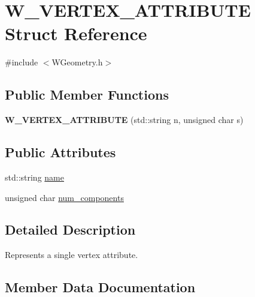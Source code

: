 \hypertarget{struct_w___v_e_r_t_e_x___a_t_t_r_i_b_u_t_e}{}\section{W\+\_\+\+V\+E\+R\+T\+E\+X\+\_\+\+A\+T\+T\+R\+I\+B\+U\+TE Struct Reference}
\label{struct_w___v_e_r_t_e_x___a_t_t_r_i_b_u_t_e}


{\ttfamily \#include $<$W\+Geometry.\+h$>$}

\subsection*{Public Member Functions}
\begin{DoxyCompactItemize}
\item 
{\bfseries W\+\_\+\+V\+E\+R\+T\+E\+X\+\_\+\+A\+T\+T\+R\+I\+B\+U\+TE} (std\+::string n, unsigned char s)\hypertarget{struct_w___v_e_r_t_e_x___a_t_t_r_i_b_u_t_e_af482c26336e8575553f70e125919224d}{}\label{struct_w___v_e_r_t_e_x___a_t_t_r_i_b_u_t_e_af482c26336e8575553f70e125919224d}

\end{DoxyCompactItemize}
\subsection*{Public Attributes}
\begin{DoxyCompactItemize}
\item 
std\+::string \hyperlink{struct_w___v_e_r_t_e_x___a_t_t_r_i_b_u_t_e_a428e56ded0a3989a627db00fc59613c8}{name}
\item 
unsigned char \hyperlink{struct_w___v_e_r_t_e_x___a_t_t_r_i_b_u_t_e_a79739d8644e1aa585131fc54648cd047}{num\+\_\+components}
\end{DoxyCompactItemize}


\subsection{Detailed Description}
Represents a single vertex attribute. 

\subsection{Member Data Documentation}
